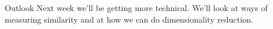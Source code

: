 \documentclass[
  10pt,
  ignorenonframetext,
  aspectratio=169]{beamer}
\newif\ifbibliography
\begin{document}
\begin{frame}{Outlook}
\protect\hypertarget{outlook}{}
Next week we'll be getting more technical. We'll look at ways of
measuring similarity and at how we can do dimensionality reduction.
\end{frame}

\begin{frame}[allowframebreaks]{}
  \bibliographytrue
  
\end{frame}
\end{document}

